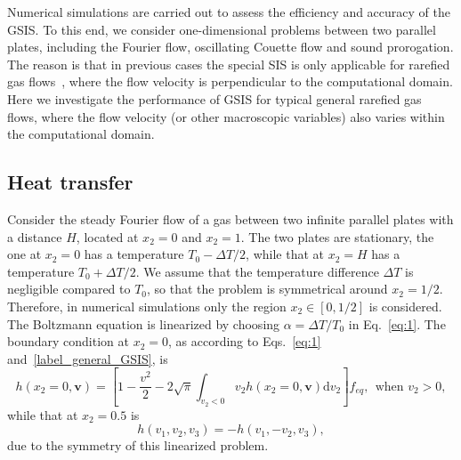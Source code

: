 Numerical simulations are carried out to assess the efficiency and accuracy of the GSIS. To this end, we consider one-dimensional problems between two parallel plates, including the Fourier flow, oscillating Couette flow and sound prorogation. The reason is that in previous cases the special SIS is only applicable for rarefied gas flows~\cite{Valougeorgis:2003zr,Naris2005Pof,CircularSIS2013,szalmas2010,WeiSuJCP1,Su2019JCP2}, where the flow velocity is perpendicular to the computational domain. Here we investigate the performance of GSIS for typical general rarefied gas flows, where the flow velocity (or other macroscopic variables) also varies within the computational domain.


\subsection{Heat transfer}


Consider the steady Fourier flow of a gas between two infinite parallel plates with a distance $H$, located at $x_2=0$ and $x_2=1$. The two plates are stationary, the one at $x_2=0$ has a temperature $T_0-\Delta{T}/2$, while that at $x_2=H$ has a temperature $T_0+\Delta{T}/2$. We assume that the temperature difference $\Delta{T}$ is negligible compared to $T_0$, so that the problem is symmetrical around $x_2=1/2$. Therefore, in numerical simulations only the region $x_2\in[0,1/2]$ is considered. The Boltzmann equation is linearized by choosing $\alpha=\Delta{T}/{T_0}$ in Eq.~\eqref{eq:1}. The boundary condition at $x_2=0$, as according to Eqs.~\eqref{eq:1} and~\eqref{label_general_GSIS}, is 
\begin{equation}
h(x_2=0,\bm{v})= \left[ 1-\frac{v^2}{2}-2\sqrt{\pi}\int_{v_2<0} v_2h(x_2=0,\bm{v})\mathrm{d}v_2\right] f_{eq}, \ \  \text{when~}  {v_2>0},
\end{equation}
while that at $x_2=0.5$ is
\begin{equation}\label{Fourier_symm}
h(v_1,v_2,v_3)=-h(v_1,-v_2,v_3),
\end{equation}
due to the symmetry of this linearized problem.

